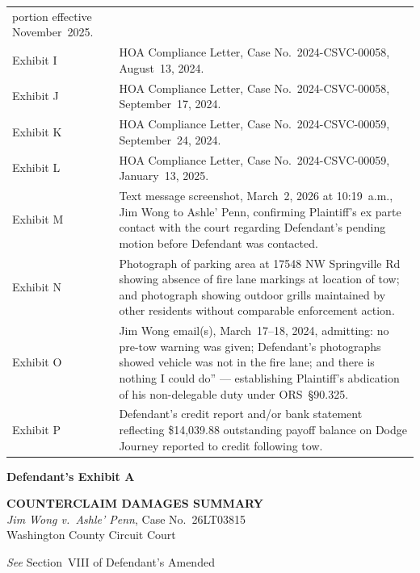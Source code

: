\documentclass[10pt,letterpaper,oneside]{extarticle}
\begin{document}
\begin{longtable}{p{0.9in} p{4.7in}}
	portion effective November~2025. \\[6pt]
	Exhibit I & HOA Compliance Letter, Case No.\
	2024-CSVC-00058, August~13, 2024. \\[6pt]
	Exhibit J & HOA Compliance Letter, Case No.\
	2024-CSVC-00058, September~17, 2024. \\[6pt]
	Exhibit K & HOA Compliance Letter, Case No.\
	2024-CSVC-00059, September~24, 2024. \\[6pt]
	Exhibit L & HOA Compliance Letter, Case No.\
	2024-CSVC-00059, January~13, 2025. \\[6pt]
	Exhibit M & Text message screenshot, March~2, 2026
	at 10:19~a.m., Jim Wong to Ashle' Penn, confirming
	Plaintiff's ex parte contact with the court
	regarding Defendant's pending motion before
	Defendant was contacted. \\[6pt]
	Exhibit N & Photograph of parking area at 17548 NW
	Springville Rd showing absence of fire lane markings
	at location of tow; and photograph showing outdoor
	grills maintained by other residents without
	comparable enforcement action. \\[6pt]
	Exhibit O & Jim Wong email(s), March~17--18, 2024,
	admitting: no pre-tow warning was given; Defendant's
	photographs showed vehicle was not in the fire lane;
	and there is nothing I could do'' --- establishing
	Plaintiff's abdication of his non-delegable duty
	under ORS~\S90.325. \\[6pt]
	Exhibit P & Defendant's credit report and/or bank
	statement reflecting \$14,039.88 outstanding payoff
	balance on Dodge Journey reported to credit
	following tow. \\
	\bottomrule
\end{longtable}
\newpage
\fancyfoot[L]{\fontsize{8}{10}\selectfont
	\textbf{\textsc{DEFENDANT'S EXHIBIT A}} ---
	Pg.~\thepage}
\begin{flushleft}
	\textbf{\large Defendant's Exhibit A}
\end{flushleft}
\begin{center}
	\textbf{COUNTERCLAIM DAMAGES SUMMARY}\\[4pt]
	\textit{Jim Wong v.\ Ashle' Penn},
	Case No.\ 26LT03815\\[4pt]
	Washington County Circuit Court
\end{center}
\vspace{0.5em}
\noindent \textit{See} Section~VIII of Defendant's Amended
\end{document}
